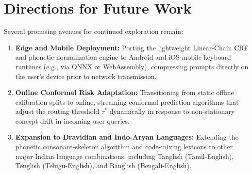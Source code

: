 \section{Directions for Future Work}
Several promising avenues for continued exploration remain:
\begin{enumerate}
    \item \textbf{Edge and Mobile Deployment:} Porting the lightweight Linear-Chain CRF and phonetic normalization engine to Android and iOS mobile keyboard runtimes (e.g., via ONNX or WebAssembly), compressing prompts directly on the user's device prior to network transmission.
    \item \textbf{Online Conformal Risk Adaptation:} Transitioning from static offline calibration splits to online, streaming conformal prediction algorithms that adjust the routing threshold $\tau^*$ dynamically in response to non-stationary concept drift in incoming user queries.
    \item \textbf{Expansion to Dravidian and Indo-Aryan Languages:} Extending the phonetic consonant-skeleton algorithm and code-mixing lexicons to other major Indian language combinations, including Tanglish (Tamil-English), Tenglish (Telugu-English), and Banglish (Bengali-English).
\end{enumerate}
